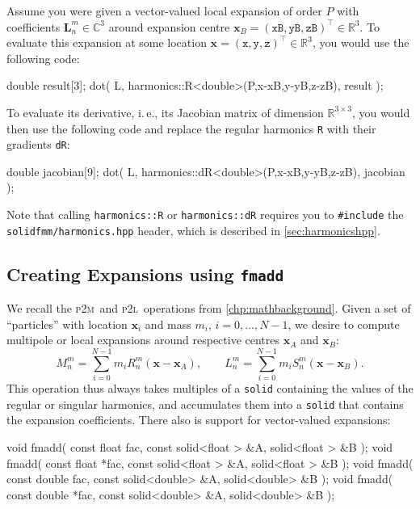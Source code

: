 \documentclass{scrbook}
\newcommand{\PtoM}{\textsc{p2m}}
\newcommand{\PtoL}{\textsc{p2l}}
\newcommand{\reals}{\ensuremath{\mathbb{R}}}
\newcommand{\complex}{\mathbb{C}}
\newcommand{\vv}[1]{\ensuremath{\symbf{#1}}} %
\begin{document}
Assume you were given a vector-valued local expansion of order $P$ with
coefficients $\vv{L}_n^m\in\complex^3$ around expansion centre $\vv{x}_B=
(\mathtt{xB},\mathtt{yB},\mathtt{zB})^\top\in\reals^3$. To evaluate this
expansion at some location 
$\vv{x}=(\mathtt{x},\mathtt{y},\mathtt{z})^\top\in\reals^3$, you would use
the following code:
\begin{cppcode*}
double result[3];
dot( L, harmonics::R<double>(P,x-xB,y-yB,z-zB), result ); 
\end{cppcode*}
To evaluate its derivative, i.\,e., its Jacobian matrix of dimension
$\reals^{3\times 3}$, you would then use the following code and 
replace the regular harmonics \lstinline|R| with their gradients \lstinline|dR|:
\begin{cppcode*}
double jacobian[9];
dot( L, harmonics::dR<double>(P,x-xB,y-yB,z-zB), jacobian );
\end{cppcode*}
Note that calling \lstinline|harmonics::R| or \lstinline|harmonics::dR| requires
you to \lstinline[style=cpp]|#include| the \lstinline|solidfmm/harmonics.hpp|
header, which is described in \cref{sec:harmonicshpp}.

\subsection{Creating Expansions using \texttt{fmadd}}
We recall the \PtoM\ and \PtoL\ operations from \cref{chp:mathbackground}.
Given a set of \enquote{particles} with location $\vv{x}_i$ and mass $m_i$,
$i=0,\dotsc,N-1$, we desire to compute multipole or local
expansions around respective centres $\vv{x}_A$ and $\vv{x}_B$:
\begin{equation}
M_n^m = \sum_{i=0}^{N-1}m_i R_n^m(\vv{x}-\vv{x}_A),\qquad
L_n^m = \sum_{i=0}^{N-1}m_i S_n^m(\vv{x}-\vv{x}_B).
\end{equation}
This operation thus always takes multiples of a \lstinline|solid| containing the
values of the regular or singular harmonics, and accumulates them into a
\lstinline|solid| that contains the expansion coefficients. There also is
support for vector-valued expansions:
\begin{cppcode*}
void fmadd( const float   fac, const solid<float > &A, solid<float > &B );
void fmadd( const float  *fac, const solid<float > &A, solid<float > &B );
void fmadd( const double  fac, const solid<double> &A, solid<double> &B );
void fmadd( const double *fac, const solid<double> &A, solid<double> &B );
\end{cppcode*}
\end{document}
